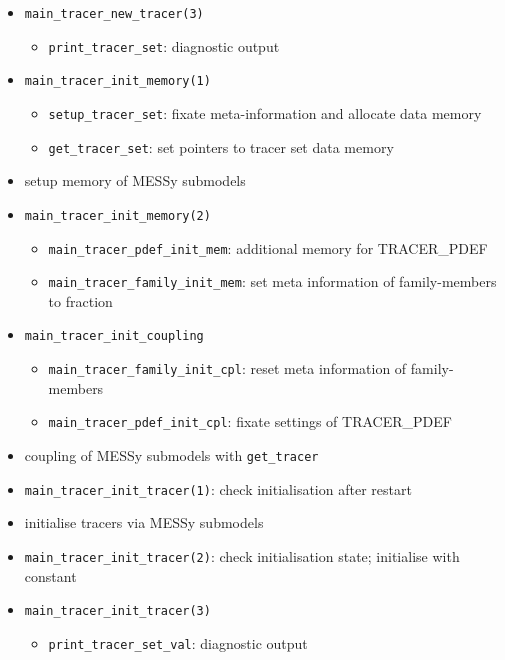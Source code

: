 \documentclass[twoside]{article}
\begin{document}
\begin{itemize}
  \item {\tt main\_tracer\_new\_tracer(3)}
        \begin{itemize}
          \item {\tt print\_tracer\_set}: diagnostic output
        \end{itemize}

  \item {\tt main\_tracer\_init\_memory(1)}
        \begin{itemize}
          \item {\tt setup\_tracer\_set}:
                fixate meta-information and allocate data
                memory
          \item {\tt get\_tracer\_set}:
                set pointers to tracer set data memory
        \end{itemize}

  \item setup memory of MESSy submodels

  \item {\tt main\_tracer\_init\_memory(2)}
        \begin{itemize}
          \item {\tt main\_tracer\_pdef\_init\_mem}:
                additional memory for TRACER\_PDEF
          \item {\tt main\_tracer\_family\_init\_mem}:
                set meta information of
                family-members to fraction
        \end{itemize}

  \item {\tt main\_tracer\_init\_coupling}
        \begin{itemize}
          \item {\tt main\_tracer\_family\_init\_cpl}:
                reset meta information of
                family-members
          \item {\tt main\_tracer\_pdef\_init\_cpl}:
                fixate settings of TRACER\_PDEF
        \end{itemize}

  \item coupling of MESSy submodels with {\tt get\_tracer}

  \item {\tt main\_tracer\_init\_tracer(1)}:
        check initialisation after restart

  \item initialise tracers via MESSy submodels

  \item {\tt main\_tracer\_init\_tracer(2)}:
        check initialisation state; initialise with constant

  \item {\tt main\_tracer\_init\_tracer(3)} 
        \begin{itemize}
          \item {\tt print\_tracer\_set\_val}: diagnostic output
        \end{itemize}
\end{itemize}
\end{document}
